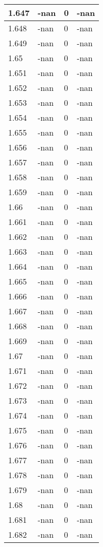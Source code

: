 \documentclass[a4paper,14pt]{extarticle}
\begin{document}
\begin{longtable}{||m{3cm}||m{3cm}|m{3cm}||m{3cm}||}
\hline
1.647 & -nan & 0 & -nan\\
\hline
1.648 & -nan & 0 & -nan\\
\hline
1.649 & -nan & 0 & -nan\\
\hline
1.65 & -nan & 0 & -nan\\
\hline
1.651 & -nan & 0 & -nan\\
\hline
1.652 & -nan & 0 & -nan\\
\hline
1.653 & -nan & 0 & -nan\\
\hline
1.654 & -nan & 0 & -nan\\
\hline
1.655 & -nan & 0 & -nan\\
\hline
1.656 & -nan & 0 & -nan\\
\hline
1.657 & -nan & 0 & -nan\\
\hline
1.658 & -nan & 0 & -nan\\
\hline
1.659 & -nan & 0 & -nan\\
\hline
1.66 & -nan & 0 & -nan\\
\hline
1.661 & -nan & 0 & -nan\\
\hline
1.662 & -nan & 0 & -nan\\
\hline
1.663 & -nan & 0 & -nan\\
\hline
1.664 & -nan & 0 & -nan\\
\hline
1.665 & -nan & 0 & -nan\\
\hline
1.666 & -nan & 0 & -nan\\
\hline
1.667 & -nan & 0 & -nan\\
\hline
1.668 & -nan & 0 & -nan\\
\hline
1.669 & -nan & 0 & -nan\\
\hline
1.67 & -nan & 0 & -nan\\
\hline
1.671 & -nan & 0 & -nan\\
\hline
1.672 & -nan & 0 & -nan\\
\hline
1.673 & -nan & 0 & -nan\\
\hline
1.674 & -nan & 0 & -nan\\
\hline
1.675 & -nan & 0 & -nan\\
\hline
1.676 & -nan & 0 & -nan\\
\hline
1.677 & -nan & 0 & -nan\\
\hline
1.678 & -nan & 0 & -nan\\
\hline
1.679 & -nan & 0 & -nan\\
\hline
1.68 & -nan & 0 & -nan\\
\hline
1.681 & -nan & 0 & -nan\\
\hline
1.682 & -nan & 0 & -nan\\

\end{longtable}
\end{document}

